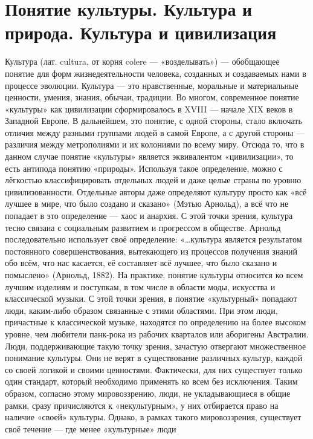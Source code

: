 \documentclass[12pt]{article}
\begin{document}
\section{Понятие культуры. Культура и природа. Культура и цивилизация}
Культура (лат. cultura, от корня colere — «возделывать») — обобщающее понятие для форм жизнедеятельности
человека, созданных и создаваемых нами в процессе эволюции. Культура — это нравственные, моральные и
материальные ценности, умения, знания, обычаи, традиции. 
Во многом, современное понятие «культуры» как цивилизации сформировалось в XVIII — начале XIX веков в
Западной  Европе.  В  дальнейшем,  это  понятие,  с  одной  стороны,  стало  включать  отличия  между  разными
группами людей в самой Европе, а с другой стороны — различия между метрополиями и их колониями по
всему миру. Отсюда то, что в данном случае понятие «культуры» является эквивалентом «цивилизации», то есть
антипода понятию «природы». Используя такое определение, можно с лёгкостью классифицировать отдельных
людей и даже целые страны по уровню цивилизованности. Отдельные авторы даже определяют культуру просто
как «всё лучшее в мире, что было создано и сказано» (Мэтью Арнольд), а всё что не попадает в это определение
— хаос и анархия. С этой точки зрения, культура тесно связана с социальным развитием и прогрессом в
обществе.  Арнольд  последовательно  использует  своё  определение:  «…культура  является  результатом
постоянного совершенствования, вытекающего из процессов получения знаний обо всём, что нас касается, её
составляет всё лучшее, что было сказано и помыслено» (Арнольд, 1882).
На практике, понятие культуры относится ко всем лучшим изделиям и поступкам, в том числе в области моды,
искусства и классической музыки. С этой точки зрения, в понятие «культурный» попадают люди, каким-либо
образом  связанные  с этими  областями. При  этом  люди, причастные к  классической  музыке, находятся  по
определению  на  более  высоком  уровне,  чем  любители  панк-рока  из  рабочих  кварталов  или  аборигены
Австралии.
Люди, поддерживающие такую точку зрения, зачастую отвергают множественное понимание культуры. Они не
верят в существование различных культур, каждой со своей логикой и своими ценностями. Фактически, для них
существует только один стандарт, который необходимо применять ко всем без исключения. Таким образом,
согласно  этому  мировоззрению,  люди,  не  укладывающиеся  в  общие  рамки,  сразу  причисляются  к
«некультурным», у них отбирается право на наличие «своей» культуры.
Однако,  в  рамках  такого  мировоззрения,  существует  своё  течение  —  где  менее  «культурные»  люди
\end{document}
